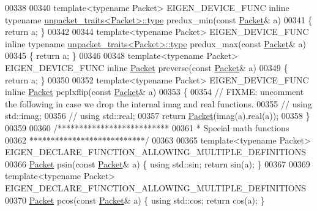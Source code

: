 \begin{DoxyCode}
{00338 
00340 \textcolor{keyword}{template}<\textcolor{keyword}{typename} Packet> EIGEN\_DEVICE\_FUNC \textcolor{keyword}{inline} \textcolor{keyword}{typename} 
      \hyperlink{union_eigen_1_1internal_1_1_packet}{unpacket\_traits<Packet>::type} predux\_min(\textcolor{keyword}{const} 
      \hyperlink{union_eigen_1_1internal_1_1_packet}{Packet}& a)
00341 \{ \textcolor{keywordflow}{return} a; \}
00342 
00344 \textcolor{keyword}{template}<\textcolor{keyword}{typename} Packet> EIGEN\_DEVICE\_FUNC \textcolor{keyword}{inline} \textcolor{keyword}{typename} 
      \hyperlink{union_eigen_1_1internal_1_1_packet}{unpacket\_traits<Packet>::type} predux\_max(\textcolor{keyword}{const} 
      \hyperlink{union_eigen_1_1internal_1_1_packet}{Packet}& a)
00345 \{ \textcolor{keywordflow}{return} a; \}
00346 
00348 \textcolor{keyword}{template}<\textcolor{keyword}{typename} Packet> EIGEN\_DEVICE\_FUNC \textcolor{keyword}{inline} \hyperlink{union_eigen_1_1internal_1_1_packet}{Packet} preverse(\textcolor{keyword}{const} 
      \hyperlink{union_eigen_1_1internal_1_1_packet}{Packet}& a)
00349 \{ \textcolor{keywordflow}{return} a; \}
00350 
00352 \textcolor{keyword}{template}<\textcolor{keyword}{typename} Packet> EIGEN\_DEVICE\_FUNC \textcolor{keyword}{inline} \hyperlink{union_eigen_1_1internal_1_1_packet}{Packet} pcplxflip(\textcolor{keyword}{const} 
      \hyperlink{union_eigen_1_1internal_1_1_packet}{Packet}& a)
00353 \{
00354   \textcolor{comment}{// FIXME: uncomment the following in case we drop the internal imag and real functions.}
00355 \textcolor{comment}{//   using std::imag;}
00356 \textcolor{comment}{//   using std::real;}
00357   \textcolor{keywordflow}{return} \hyperlink{union_eigen_1_1internal_1_1_packet}{Packet}(imag(a),real(a));
00358 \}
00359 
00360 \textcolor{comment}{/**************************}
00361 \textcolor{comment}{* Special math functions}
00362 \textcolor{comment}{***************************/}
00363 
00365 \textcolor{keyword}{template}<\textcolor{keyword}{typename} Packet> EIGEN\_DECLARE\_FUNCTION\_ALLOWING\_MULTIPLE\_DEFINITIONS
00366 \hyperlink{union_eigen_1_1internal_1_1_packet}{Packet} psin(\textcolor{keyword}{const} \hyperlink{union_eigen_1_1internal_1_1_packet}{Packet}& a) \{ \textcolor{keyword}{using} std::sin; \textcolor{keywordflow}{return} sin(a); \}
00367 
00369 \textcolor{keyword}{template}<\textcolor{keyword}{typename} Packet> EIGEN\_DECLARE\_FUNCTION\_ALLOWING\_MULTIPLE\_DEFINITIONS
00370 \hyperlink{union_eigen_1_1internal_1_1_packet}{Packet} pcos(\textcolor{keyword}{const} \hyperlink{union_eigen_1_1internal_1_1_packet}{Packet}& a) \{ \textcolor{keyword}{using} std::cos; \textcolor{keywordflow}{return} cos(a); \}
}
\end{DoxyCode}
